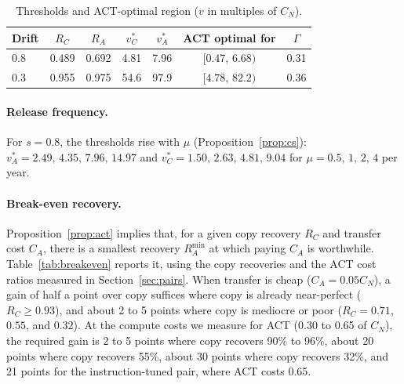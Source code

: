 \documentclass[preprint,12pt,authoryear]{elsarticle}
\begin{document}
\begin{table}[t]
\centering
\caption{Thresholds and ACT-optimal region ($v$ in multiples of $C_N$).}\label{tab:policy}
\begin{tabular}{lcccccc}
\toprule
Drift & $R_C$ & $R_A$ & $v^*_C$ & $v^*_A$ & ACT optimal for & $\Gamma$\\
\midrule
0.8 & 0.489 & 0.692 & 4.81 & 7.96 & $[0.47,\,6.68)$ & 0.31\\
0.3 & 0.955 & 0.975 & 54.6 & 97.9 & $[4.78,\,82.2)$ & 0.36\\
\bottomrule
\end{tabular}
\end{table}

\paragraph{Release frequency.} For $s=0.8$, the thresholds rise with $\mu$ (Proposition~\ref{prop:cs}):
$v^*_A=2.49,\,4.35,\,7.96,\,14.97$ and $v^*_C=1.50,\,2.63,\,4.81,\,9.04$ for $\mu=0.5,\,1,\,2,\,4$ per year.

\paragraph{Break-even recovery.} Proposition~\ref{prop:act} implies that, for a given copy recovery $R_C$ and transfer cost
$C_A$, there is a smallest recovery $R_A^{\min}$ at which paying $C_A$ is worthwhile. Table~\ref{tab:breakeven} reports it, using the copy recoveries and
the ACT cost ratios measured in Section~\ref{sec:pairs}. When transfer is cheap ($C_A=0.05C_N$), a gain of half a point over copy suffices where copy is already
near-perfect ($R_C\ge 0.93$), and about 2 to 5 points where copy is mediocre or poor ($R_C=0.71$, $0.55$, and $0.32$). At the compute costs we measure for ACT (0.30 to 0.65 of $C_N$),
the required gain is 2 to 5 points where copy recovers 90\% to 96\%, about 20 points where copy recovers 55\%, about 30 points where copy recovers 32\%, and 21 points for the instruction-tuned pair, where ACT costs 0.65.
\end{document}

